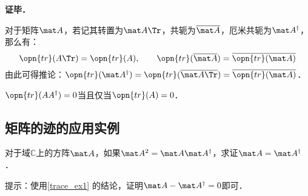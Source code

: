 \textbf{证毕．}

\begin{exercise}{}\label{trace_exe1}
对于矩阵$\mat A$，若记其转置为$\mat A\Tr$，共轭为$\overline{\mat A}$，厄米共轭为$\mat A^\dagger$，那么有：
\begin{equation}
\opn{tr}(A\Tr)=\opn{tr}(A), \qquad \opn{tr}(\overline{\mat A})=\overline{\opn{tr}(\mat A)}
\end{equation}
由此可得推论：$\opn{tr}(\mat A^\dagger)=\opn{tr}(\overline{\mat A\Tr})=\overline{\opn{tr}(\mat A)}$．
\end{exercise}

\begin{example}{}\label{trace_ex1}
$\opn{tr}(AA^\dagger)=0$当且仅当$\opn{tr}(A)=0$．
\end{example}

\subsection{矩阵的迹的应用实例}

\begin{exercise}{}
对于域$\mathbb{C}$上的方阵$\mat A$，如果$\mat A^2=\mat A\mat A^\dagger$，求证$\mat A=\mat A^\dagger$．

提示：使用\autoref{trace_ex1} 的结论，证明$\mat A-\mat A^\dagger=0$即可．
\end{exercise}



